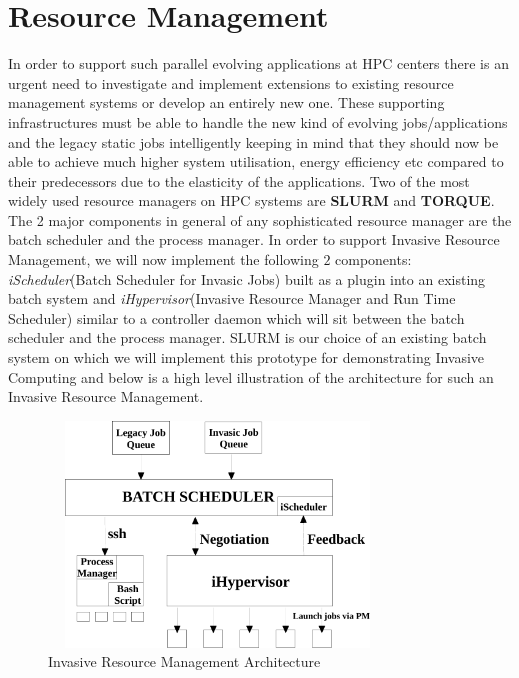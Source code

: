 \section{Resource Management}
In order to support such parallel evolving applications at HPC centers there is an urgent need to investigate and implement extensions to existing resource management systems or develop an entirely new one. These supporting infrastructures must be able to handle the new kind of evolving jobs/applications and the legacy static jobs intelligently keeping in mind that they should now be able to achieve much higher system utilisation, energy efficiency etc compared to their predecessors due to the elasticity of the applications. Two of the most widely used resource managers on HPC systems are \textbf{SLURM} and \textbf{TORQUE}. The 2 major components in general of any sophisticated resource manager are the batch scheduler and the process manager. In order to support Invasive Resource Management, we will now implement the following $2$ components: \textit{iScheduler}(Batch Scheduler for Invasic Jobs) built as a plugin into an existing batch system and \textit{iHypervisor}(Invasive Resource Manager and Run Time Scheduler) similar to a controller daemon which will sit between the batch scheduler and the process manager. SLURM is our choice of an existing batch system on which we will implement this prototype for demonstrating Invasive Computing and below is a high level illustration of the architecture for such an Invasive Resource Management.\par
\begin{figure}[!htbp]
\centering
\includegraphics[width=0.8\textwidth, height=60mm]{./figures/architecture.pdf}
\caption{Invasive Resource Management Architecture}
\label{fig:1}
\end{figure}
